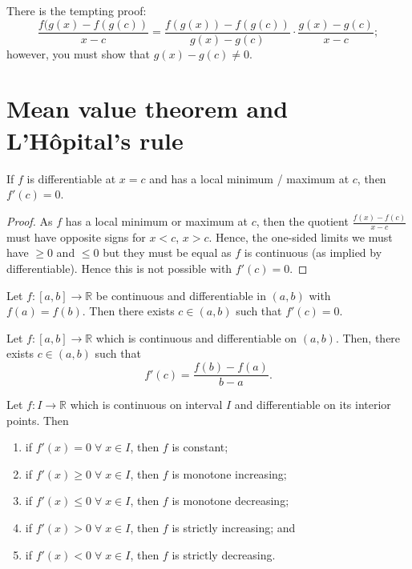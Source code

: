 \begin{remark}
    There is the tempting proof:
    \[ \frac{f(g(x) - f(g(c))}{x - c} = \frac{f(g(x)) - f(g(c))}{g(x) - g(c)} \cdot \frac{g(x) - g(c)}{x - c}; \] however, you must show that $g(x) - g(c) \neq 0$.
\end{remark}

\section{Mean value theorem and L'H\^opital's rule}

\begin{proposition}
    If $f$ is differentiable at $x = c$ and has a local minimum / maximum at $c$, then $f'(c) = 0$.
\end{proposition}

\begin{proof}
    As $f$ has a local minimum or maximum at $c$, then the quotient $\frac{f(x) - f(c)}{x - c}$ must have opposite signs for $x < c$, $x > c$. Hence, the one-sided limits we must have $\geq 0$ and $\leq 0$ but they must be equal as $f$ is continuous (as implied by differentiable). Hence this is not possible with $f'(c) = 0$.
\end{proof}

\begin{theorem}
    Let $f : [a, b] \to \mathbb{R}$ be continuous and differentiable in $(a, b)$ with $f(a) = f(b)$. Then there exists $c \in (a, b)$ such that $f'(c) = 0$.
\end{theorem}

\begin{theorem}
    Let $f : [a, b] \to \mathbb{R}$ which is continuous and differentiable on $(a, b)$. Then, there exists $c \in (a, b)$ such that \[ f'(c) = \frac{f(b) - f(a)}{b - a}. \]
\end{theorem}

\begin{theorem}
    Let $f : I \to \mathbb{R}$ which is continuous on interval $I$ and differentiable on its interior points. Then
    \begin{enumerate}
        \item if $f'(x) = 0 \; \forall \; x \in I$, then $f$ is constant;
        \item if $f'(x) \geq 0 \; \forall \; x \in I$, then $f$ is monotone increasing;
        \item if $f'(x) \leq 0 \; \forall \; x \in I$, then $f$ is monotone decreasing;
        \item if $f'(x) > 0 \; \forall \; x \in I$, then $f$ is strictly increasing; and
        \item if $f'(x) < 0 \; \forall \; x \in I$, then $f$ is strictly decreasing.
    \end{enumerate}
\end{theorem}

